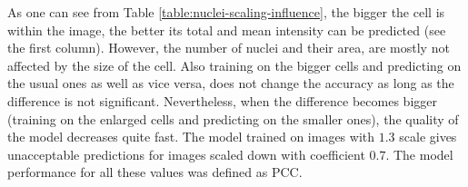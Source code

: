 
As one can see from Table \ref{table:nuclei-scaling-influence}, the bigger the cell is within the image, the better its total and mean intensity can be predicted (see the first column). However, the number of nuclei and their area, are mostly not affected by the size of the cell. Also training on the bigger cells and predicting on the usual ones as well as vice versa, does not change the accuracy as long as the difference is not significant. Nevertheless, when the difference becomes bigger (training on the enlarged cells and predicting on the smaller ones), the quality of the model decreases quite fast. The model trained on images with $1.3$ scale gives unacceptable predictions for images scaled down with coefficient $0.7$. The model performance for all these values was defined as PCC.
